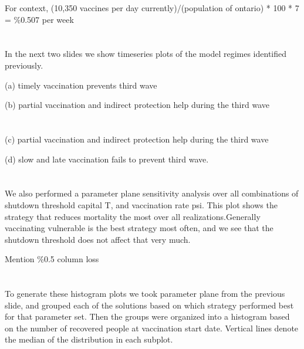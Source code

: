 \documentclass{article}
\begin{document}

For context, 
(10,350 vaccines per day currently)/(population of ontario) * 100 * 7 = \%0.507 per week 

\section{}

In the next two slides we show timeseries plots of the model regimes identified previously.


(a) timely vaccination prevents third wave

(b) partial vaccination and indirect protection help during the third wave

\section[Slide]{}

(c) partial vaccination and indirect protection help during the third wave

(d) slow and late vaccination fails to prevent third wave.

\section{}

We also performed a parameter plane sensitivity analysis over all combinations of shutdown threshold capital T, and vaccination rate psi. This plot shows the strategy that reduces mortality the most over all realizations.Generally vaccinating vulnerable is the best strategy most often, and we see that the shutdown threshold does not affect that very much. 

Mention \%0.5 column loss
\section{}

To generate these histogram plots we took parameter plane from the previous slide, and grouped each of the solutions based on which strategy performed best for that parameter set. Then the groups were organized into a histogram based on the number of recovered people at vaccination start date. Vertical lines denote the median of the distribution in each subplot.

\section{}
\end{document}
